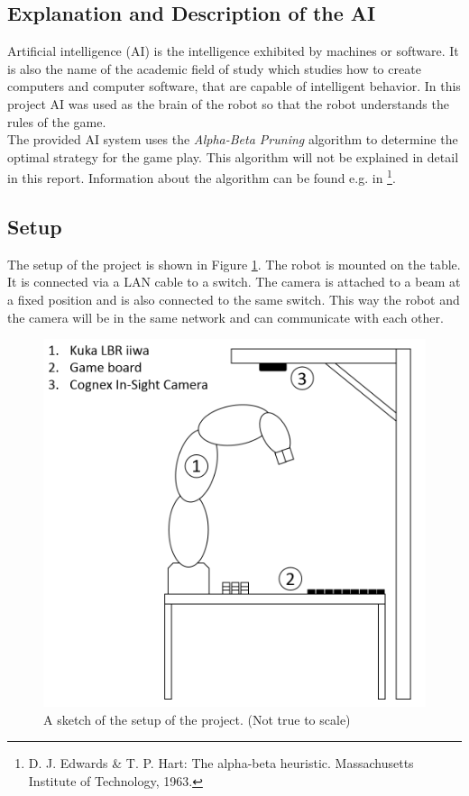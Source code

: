 \documentclass[a4paper]{spie}  %
\begin{document}
\begin{large}
\subsection{Explanation and Description of the AI}
Artificial intelligence (AI) is the intelligence exhibited by machines or software. It is also the name of the academic field of study which studies how to create computers and computer software, that are capable of intelligent behavior. In this project AI was used as the brain of the robot so that the robot understands the rules of the game. 
\\The provided AI system uses the \emph{Alpha-Beta Pruning} algorithm to determine the optimal strategy for the game play. This algorithm will not be explained in detail in this report. Information about the algorithm can be found e.g. in \footnote{D. J. Edwards \& T. P. Hart: The alpha-beta heuristic. Massachusetts Institute of Technology, 1963.}.\\
\subsection{Setup}
The setup of the project is shown in Figure \ref{setup_overview}. The robot is mounted on the table. It is connected via a LAN cable to a switch. The camera is attached to a beam at a fixed position and is also connected to the same switch. This way the robot and the camera will be in the same network and can communicate with each other.
\begin{figure}[h]
\includegraphics[width=13cm]{images/setup_overview.png}
\centering
\caption{A sketch of the setup of the project. (Not true to scale)}
\label{setup_overview}
\end{figure}
\clearpage

\end{large}
\end{document}
